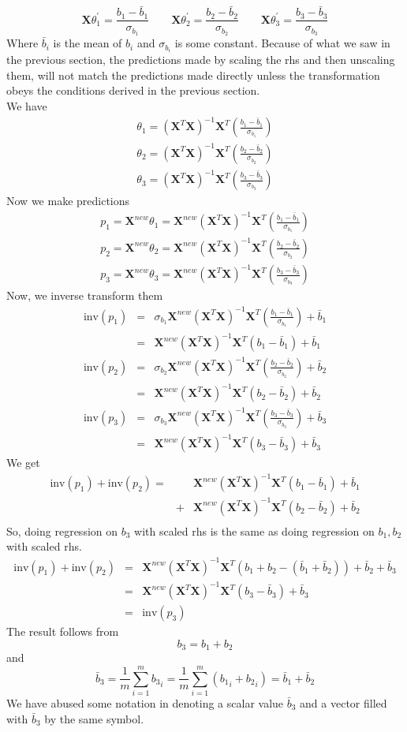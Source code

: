 \documentclass{article}
\newcommand{\beq}{\begin{equation}}
\newcommand{\eeq}{\end{equation}}
\newcommand{\ber}{\begin{eqnarray}}
\newcommand{\eer}{\end{eqnarray}}
\begin{document}
\beq
\pmb{X}\theta_1^{'}=\frac{b_1-\bar{b}_1}{\sigma_{b_1}} \qquad \pmb{X}\theta_2^{'}=\frac{b_2-\bar{b}_2}{\sigma_{b_2}} \qquad \pmb{X}\theta_3^{'}=\frac{b_3-\bar{b}_3}{\sigma_{b_3}}
\eeq
Where $\bar{b}_i$ is the mean of $b_i$ and $\sigma_{b_i}$ is some constant. Because of what we saw in the previous section, the predictions made by scaling the rhs and then unscaling them, will not match the predictions made directly unless the transformation obeys the conditions derived in the previous section.\\
We have
\ber
\theta_1 = (\pmb{X}^T\pmb{X})^{-1}\pmb{X}^T (\frac{b_1-\bar{b}_1}{\sigma_{b_1}})\\
\theta_2 = (\pmb{X}^T\pmb{X})^{-1}\pmb{X}^T (\frac{b_2-\bar{b}_2}{\sigma_{b_2}})\\
\theta_3 = (\pmb{X}^T\pmb{X})^{-1}\pmb{X}^T (\frac{b_3-\bar{b}_3}{\sigma_{b_3}})
\eer
Now we make predictions
\ber
p_1 = \pmb{X}^{new}\theta_1 = \pmb{X}^{new}(\pmb{X}^T\pmb{X})^{-1}\pmb{X}^T (\frac{b_1-\bar{b}_1}{\sigma_{b_1}})\\
p_2 = \pmb{X}^{new}\theta_2 = \pmb{X}^{new}(\pmb{X}^T\pmb{X})^{-1}\pmb{X}^T (\frac{b_2-\bar{b}_2}{\sigma_{b_2}})\\
p_3 = \pmb{X}^{new}\theta_3 = \pmb{X}^{new}(\pmb{X}^T\pmb{X})^{-1}\pmb{X}^T (\frac{b_3-\bar{b}_3}{\sigma_{b_3}})
\eer
Now, we inverse transform them
\ber
\text{inv}(p_1) &=& \sigma_{b_1}\pmb{X}^{new}(\pmb{X}^T\pmb{X})^{-1}\pmb{X}^T (\frac{b_1-\bar{b}_1}{\sigma_{b_1}}) + \bar{b}_1\\
&=& \pmb{X}^{new}(\pmb{X}^T\pmb{X})^{-1}\pmb{X}^T (b_1-\bar{b}_1) + \bar{b}_1 \\
%
\text{inv}(p_2) &=& \sigma_{b_2}\pmb{X}^{new}(\pmb{X}^T\pmb{X})^{-1}\pmb{X}^T (\frac{b_2-\bar{b}_2}{\sigma_{b_2}}) + \bar{b}_2\\
&=& \pmb{X}^{new}(\pmb{X}^T\pmb{X})^{-1}\pmb{X}^T (b_2-\bar{b}_2) + \bar{b}_2\\
\text{inv}(p_3) &=& \sigma_{b_3}\pmb{X}^{new}(\pmb{X}^T\pmb{X})^{-1}\pmb{X}^T (\frac{b_3-\bar{b}_3}{\sigma_{b_3}}) + \bar{b}_3\\
&=& \pmb{X}^{new}(\pmb{X}^T\pmb{X})^{-1}\pmb{X}^T (b_3-\bar{b}_3) + \bar{b}_3 
\eer
We get
\ber
\text{inv}(p_1) + \text{inv}(p_2) = & & \pmb{X}^{new}(\pmb{X}^T\pmb{X})^{-1}\pmb{X}^T (b_1-\bar{b}_1) + \bar{b}_1 \\ &+&  \pmb{X}^{new}(\pmb{X}^T\pmb{X})^{-1}\pmb{X}^T (b_2-\bar{b}_2) + \bar{b}_2 \\
\eer
So, doing regression on $b_3$ with scaled rhs is the same as doing regression on $b_1,b_2$ with scaled rhs.
\ber
\text{inv}(p_1) + \text{inv}(p_2) &=& \pmb{X}^{new}(\pmb{X}^T\pmb{X})^{-1}\pmb{X}^T(b_1+b_2-(\bar{b}_1 + \bar{b}_2)) + \bar{b}_2 + \bar{b}_3 \\
&=& \pmb{X}^{new}(\pmb{X}^T\pmb{X})^{-1}\pmb{X}^T(b_3 - \bar{b}_3) + \bar{b}_3 \\
&=& \text{inv}(p_3)
\eer
The result follows from
\beq
b_3 = b_1 + b_2
\eeq
and
\beq
\bar{b}_3 = \frac{1}{m}\sum_{i=1}^{m} {{}{b}_3}_i = \frac{1}{m}\sum_{i=1}^{m} ({{}{b}_1}_i+{{}{b}_2}_i) = \bar{b}_1 + \bar{b}_2
\eeq
We have abused some notation in denoting a scalar value $\bar{b}_3$ and a vector filled with $\bar{b}_3$ by the same symbol.
%
%
%
\end{document}
